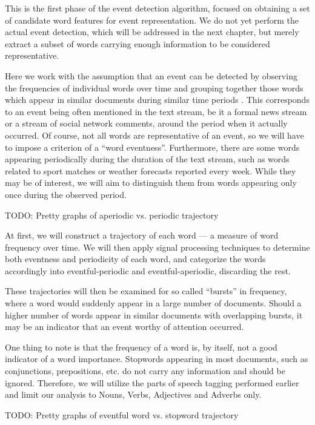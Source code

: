 This is the first phase of the event detection algorithm, focused on obtaining a set of candidate word features for event representation. We do not yet perform the actual event detection, which will be addressed in the next chapter, but merely extract a subset of words carrying enough information to be considered representative.

Here we work with the assumption that an event can be detected by observing the frequencies of individual words over time and grouping together those words which appear in similar documents during similar time periods \cite{event-detection, parameter-free}. This corresponds to an event being often mentioned in the text stream, be it a formal news stream or a stream of social network comments, around the period when it actually occurred. Of course, not all words are representative of an event, so we will have to impose a criterion of a ``word eventness''. Furthermore, there are some words appearing periodically during the duration of the text stream, such as words related to sport matches or weather forecasts reported every week. While they may be of interest, we will aim to distinguish them from words appearing only once during the observed period.

{\color{red} TODO: Pretty graphs of aperiodic vs. periodic trajectory}

At first, we will construct a trajectory of each word --- a measure of word frequency over time. We will then apply signal processing techniques to determine both eventness and periodicity of each word, and categorize the words accordingly into eventful-periodic and eventful-aperiodic, discarding the rest.

These trajectories will then be examined for so called ``bursts'' in frequency, where a word would suddenly appear in a large number of documents. Should a higher number of words appear in similar documents with overlapping bursts, it may be an indicator that an event worthy of attention occurred.

One thing to note is that the frequency of a word is, by itself, not a good indicator of a word importance.
Stopwords appearing in most documents, such as conjunctions, prepositions, etc. do not carry any information and should be ignored. Therefore, we will utilize the parts of speech tagging performed earlier and limit our analysis to Nouns, Verbs, Adjectives and Adverbs only.

{\color{red} TODO: Pretty graphs of eventful word vs. stopword trajectory}

